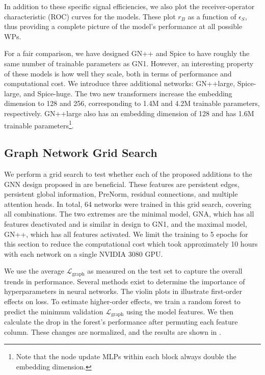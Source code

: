 In addition to these specific signal efficiencies, we also plot the receiver-operator characteristic (ROC) curves for the models.
These plot $r_B$ as a function of $\epsilon_S$, thus providing a complete picture of the model's performance at all possible WPs.

For a fair comparison, we have designed GN++ and Spice to have roughly the same number of trainable parameters as GN1.
However, an interesting property of these models is how well they scale, both in terms of performance and computational cost.
We introduce three additional networks: GN++large, Spice-large, and Spice-huge.
The two new transformers increase the embedding dimension to 128 and 256, corresponding to 1.4M and 4.2M trainable parameters, respectively.
GN++large also has an embedding dimension of 128 and has 1.6M trainable parameters\footnote{Note that the node update MLPs within each block always double the embedding dimension.}.

\subsection{Graph Network Grid Search}

We perform a grid search to test whether each of the proposed additions to the GNN design proposed in  are beneficial.
These features are persistent edges, persistent global information, PreNorm, residual connections, and multiple attention heads.
In total, 64 networks were trained in this grid search, covering all combinations.
The two extremes are the minimal model, GNA, which has all features deactivated and is similar in design to GN1, and the maximal model, GN++, which has all features activated.
We limit the training to 5 epochs for this section to reduce the computational cost which took approximately 10 hours with each network on a single NVIDIA 3080 GPU\@.

We use the average $\mathcal{L}_{\text{graph}}$ as measured on the test set to capture the overall trends in performance.
Several methods exist to determine the importance of hyperparameters in neural networks.
The violin plots in  illustrate first-order effects on loss. To estimate higher-order effects, we train a random forest to predict the minimum validation $\mathcal{L}_{\text{graph}}$ using the model features.
We then calculate the drop in the forest's performance after permuting each feature column.
These changes are normalized, and the results are shown in .

